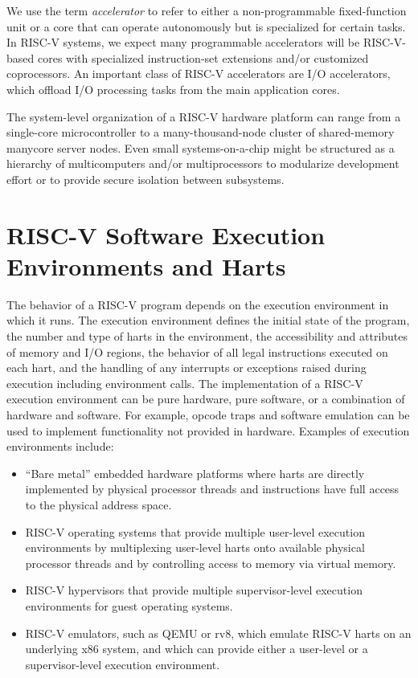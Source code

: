 We use the term {\em accelerator} to refer to either a
non-programmable fixed-function unit or a core that can operate
autonomously but is specialized for certain tasks.  In RISC-V systems,
we expect many programmable accelerators will be RISC-V-based cores
with specialized instruction-set extensions and/or customized
coprocessors.  An important class of RISC-V accelerators are I/O
accelerators, which offload I/O processing tasks from the main
application cores.

The system-level organization of a RISC-V hardware platform can range
from a single-core microcontroller to a many-thousand-node cluster of
shared-memory manycore server nodes.  Even small systems-on-a-chip
might be structured as a hierarchy of multicomputers and/or
multiprocessors to modularize development effort or to provide secure
isolation between subsystems.

\section{RISC-V Software Execution Environments and Harts}

The behavior of a RISC-V program depends on the execution environment
in which it runs.  The execution environment defines the initial state
of the program, the number and type of harts in the environment, the
accessibility and attributes of memory and I/O regions, the behavior
of all legal instructions executed on each hart, and the handling of
any interrupts or exceptions raised during execution including
environment calls.  The implementation of a RISC-V execution
environment can be pure hardware, pure software, or a combination of
hardware and software.  For example, opcode traps and software
emulation can be used to implement functionality not provided in
hardware.  Examples of execution environments include:
\begin{itemize}
  \item ``Bare metal'' embedded hardware platforms where harts are
    directly implemented by physical processor threads and
    instructions have full access to the physical address space.
  \item RISC-V operating systems that provide multiple user-level
    execution environments by multiplexing user-level harts onto
    available physical processor threads and by controlling access to
    memory via virtual memory.
  \item RISC-V hypervisors that provide multiple supervisor-level
    execution environments for guest operating systems.
  \item RISC-V emulators, such as QEMU or rv8, which emulate RISC-V
    harts on an underlying x86 system, and which can provide either a
    user-level or a supervisor-level execution environment.
\end{itemize}

